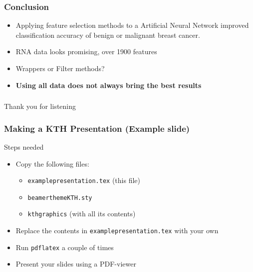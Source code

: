 \documentclass[aspectratio=1610]{beamer}
\begin{document}
\begin{frame}
  \frametitle{\hfill Conclusion}
  \begin{itemize}
  \item Applying feature selection methods to a Artificial Neural Network improved classification accuracy of benign or malignant breast cancer. \\ \pause

  \item RNA data looks promising, over 1900 features \\ \pause

  \item Wrappers or Filter methods? \\ \pause

  \item \textbf{Using all data does not always bring the best results}

  \end{itemize}
\end{frame}

\begin{frame}
  \frametitle{\hfill }
  Thank you for listening
\end{frame}



\begin{frame}
  \frametitle{\hfill Making a KTH Presentation (Example slide)}

  \begin{block}{Steps needed}
    \begin{itemize}
    \item Copy the following files:
    \begin{itemize}
    \item \texttt{examplepresentation.tex} (this file)
    \item \texttt{beamerthemeKTH.sty}
    \item \texttt{kthgraphics} (with all its contents)
    \end{itemize}
    \item Replace the contents in \texttt{examplepresentation.tex} with your own
    \item Run \texttt{pdflatex} a couple of times
    \item Present your slides using a PDF-viewer
    \end{itemize}
  \end{block}

\end{frame}
\end{document}
